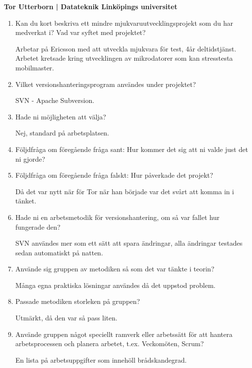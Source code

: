\clearpage
\begin{center}
    \textbf{Tor Utterborn | Datateknik Linköpings universitet}
\end{center}
\begin{enumerate}

  \item Kan du kort beskriva ett mindre mjukvaruutvecklingsprojekt som du har medverkat i? Vad var syftet med projektet?

  Arbetar på Ericsson med att utveckla mjukvara för test, 4år deltidstjänst.
  Arbetet kretsade kring utvecklingen av mikrodatorer som kan stresstesta mobilmaster.

  \item Vilket versionshanteringsprogram användes under projektet?

  SVN - Apache Subversion.

  \item Hade ni möjligheten att välja?

  Nej, standard på arbetsplatsen.

  \item Följdfråga om föregående fråga sant: Hur kommer det sig att ni valde just det ni gjorde?
  \item Följdfråga om föregående fråga falskt: Hur påverkade det projekt?

  Då det var nytt när för Tor när han började var det svårt att komma in i tänket.

  \item Hade ni en arbetsmetodik för versionshantering, om så var fallet hur fungerade den?

  SVN användes mer som ett sätt att spara ändringar, alla ändringar testades sedan automatiskt på natten.

  \item Använde sig gruppen av metodiken så som det var tänkte i teorin?

  Många egna praktiska lösningar användes då det uppstod problem.

  \item Passade metodiken storleken på gruppen?

  Utmärkt, då den var så pass liten.

  \item Använde gruppen något speciellt ramverk eller arbetssätt för att hantera arbetsprocessen och planera arbetet, t.ex. Veckomöten, Scrum?

  En lista på arbetsuppgifter som innehöll brådskandegrad.


\end{enumerate}
